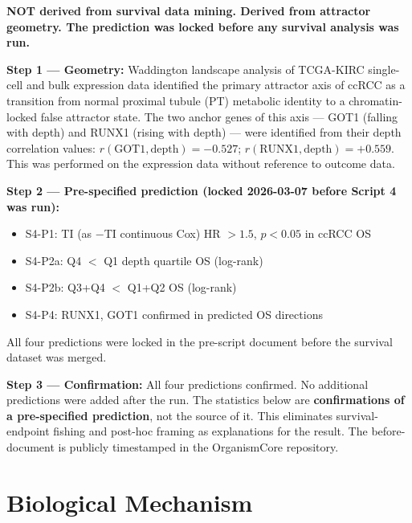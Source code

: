 \documentclass[11pt, a4paper]{article}
\begin{document}
\begin{mdframed}[backgroundcolor=derivebox,
                 linecolor=blue!50!black,
                 linewidth=1pt]
\textbf{NOT derived from survival data mining.
Derived from attractor geometry. The prediction
was locked before any survival analysis was run.}

\medskip
\textbf{Step 1 --- Geometry:}
Waddington landscape analysis of TCGA-KIRC
single-cell and bulk expression data identified
the primary attractor axis of ccRCC as a
transition from normal proximal tubule (PT)
metabolic identity to a chromatin-locked false
attractor state. The two anchor genes of this
axis --- GOT1 (falling with depth) and RUNX1
(rising with depth) --- were identified from
their depth correlation values:
$r(\text{GOT1}, \text{depth}) = -0.527$;
$r(\text{RUNX1}, \text{depth}) = +0.559$.
This was performed on the expression data
without reference to outcome data.

\medskip
\textbf{Step 2 --- Pre-specified prediction
(locked 2026-03-07 before Script 4 was run):}
\begin{itemize}[noitemsep]
    \item S4-P1: TI (as $-$TI continuous Cox)
    HR $> 1.5$, $p < 0.05$ in ccRCC OS
    \item S4-P2a: Q4 $<$ Q1 depth quartile
    OS (log-rank)
    \item S4-P2b: Q3+Q4 $<$ Q1+Q2 OS
    (log-rank)
    \item S4-P4: RUNX1, GOT1 confirmed in
    predicted OS directions
\end{itemize}
All four predictions were locked in the
pre-script document before the survival
dataset was merged.

\medskip
\textbf{Step 3 --- Confirmation:}
All four predictions confirmed. No additional
predictions were added after the run.
The statistics below are \textbf{confirmations
of a pre-specified prediction}, not the source
of it. This eliminates survival-endpoint fishing
and post-hoc framing as explanations for the
result. The before-document is publicly
timestamped in the OrganismCore repository.
\end{mdframed}

\section{Biological Mechanism}
\label{sec:mechanism}
\end{document}
